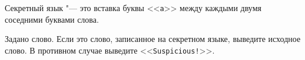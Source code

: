 Секретный язык "--- это вставка буквы <<\texttt{a}>> между каждыми двумя
соседними буквами слова.

Задано слово.
Если это слово, записанное на секретном языке, выведите исходное слово.
В противном случае выведите <<\texttt{Suspicious!}>>.
